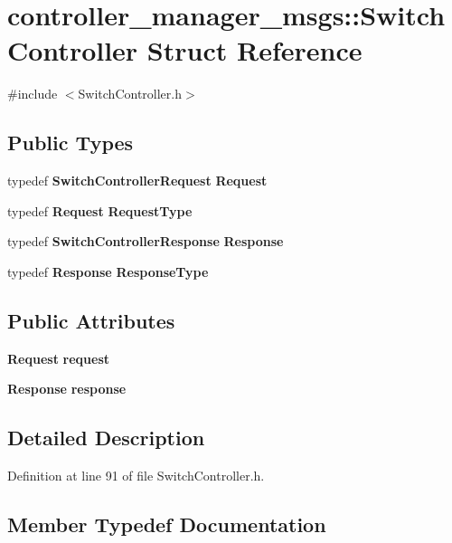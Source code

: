 \section{controller\-\_\-manager\-\_\-msgs\-:\-:\-Switch\-Controller \-Struct \-Reference}
\label{structcontroller__manager__msgs_1_1SwitchController}


{\ttfamily \#include $<$\-Switch\-Controller.\-h$>$}

\subsection*{\-Public \-Types}
\begin{DoxyCompactItemize}
\item 
typedef {\bf \-Switch\-Controller\-Request} {\bf \-Request}
\item 
typedef {\bf \-Request} {\bf \-Request\-Type}
\item 
typedef {\bf \-Switch\-Controller\-Response} {\bf \-Response}
\item 
typedef {\bf \-Response} {\bf \-Response\-Type}
\end{DoxyCompactItemize}
\subsection*{\-Public \-Attributes}
\begin{DoxyCompactItemize}
\item 
{\bf \-Request} {\bf request}
\item 
{\bf \-Response} {\bf response}
\end{DoxyCompactItemize}


\subsection{\-Detailed \-Description}


\-Definition at line 91 of file \-Switch\-Controller.\-h.



\subsection{\-Member \-Typedef \-Documentation}

